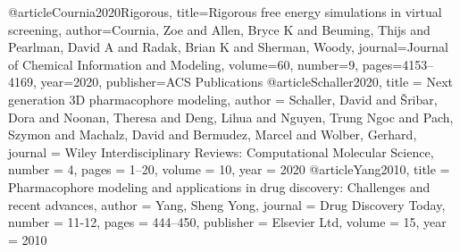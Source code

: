 @article{Cournia2020Rigorous,
  title={Rigorous free energy simulations in virtual screening},
  author={Cournia, Zoe and Allen, Bryce K and Beuming, Thijs and Pearlman, David A and Radak, Brian K and Sherman, Woody},
  journal={Journal of Chemical Information and Modeling},
  volume={60},
  number={9},
  pages={4153--4169},
  year={2020},
  publisher={ACS Publications}
}
@article{Schaller2020,
title = {Next generation 3D pharmacophore modeling},
author = {Schaller, David and {\v{S}}ribar, Dora and Noonan, Theresa and Deng, Lihua and Nguyen, Trung Ngoc and Pach, Szymon and Machalz, David and Bermudez, Marcel and Wolber, Gerhard},
journal = {Wiley Interdisciplinary Reviews: Computational Molecular Science},
number = {4},
pages = {1--20},
volume = {10},
year = {2020}
}
@article{Yang2010,
title = {Pharmacophore modeling and applications in drug discovery: Challenges and recent advances},
author = {Yang, Sheng Yong},
journal = {Drug Discovery Today},
number = {11-12},
pages = {444--450},
publisher = {Elsevier Ltd},
volume = {15},
year = {2010}
}
